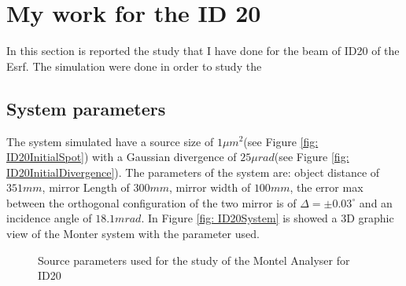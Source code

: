\section{My work for the ID 20}

In this section is reported the study that I have done for the beam of ID20 of the Esrf. The simulation were done in order to study the

\subsection{System parameters}
The system simulated have a source size of $ 1 \mu m^2 $(see Figure \ref{fig: ID20InitialSpot}) with a Gaussian divergence of $25 \mu rad $(see Figure \ref{fig: ID20InitialDivergence}). The parameters of the system are: object distance of $351 mm$, mirror Length of $300mm$, mirror width of $100mm $, the error max between the orthogonal configuration of the two mirror is of $\Delta =  \pm 0.03^{\circ} $ and an incidence angle of $18.1 mrad $. In Figure \ref{fig: ID20System} is showed a 3D graphic view of the Monter system with the parameter used.
\begin{figure}[H]
%
\centering
%
%
\quad
%
\caption{Source parameters used for the study of the Montel Analyser for ID20}
%
\end{figure}

